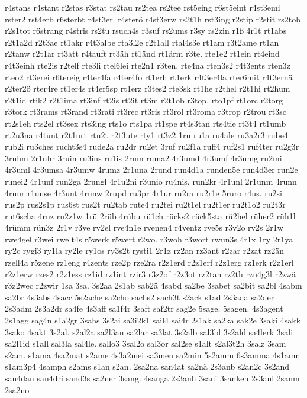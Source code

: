 {r4stans
r4stant
r2stas
r3stat
rs2tau
rs2tea
rs2tee
rst5eing
r6st5eint
r4st3emi
rster2
rst4erb
r6sterbt
r4st3erl
r4sterö
r4st3erw
rs2t1h
rst3ing
r2stip
r2stit
rs2tob
r2s1tot
r6strang
r4stris
rs2tu
rsuch4s
r3suf
rs2ums
r3sy
rs2zin
r1ß
4r1t
rt1abs
r2t1a2d
r2t3ae
rt1akr
r4t3albe
rta3l2e
r2t1all
rtal4s3e
rt1am
r3t2ame
rt1an
r2tanw
r2t1ar
rt3att
r4tauft
rt3äh
rt1änd
rt1ärm
r3te.
rte1e2
rt1ein
rt4eind
r4t3einh
rte2is
r2telf
rte3li
rtel6lei
rte2n1
r3ten.
rte4na
rten3s2
r4t3ents
rten3z
rteo2
rt3erei
r6tereig
r4ter4fa
r4ter4fo
rt1erh
rt1erk
r4t3er4la
rter6mit
r4t3ernä
r2ter2ö
rter4re
rt1er4s
rt4er5sp
rt1erz
r3tes2
rte3sk
rt1he
r2thel
r2t1hi
rt2hum
r2t1id
rtik2
r2t1ima
rt3inf
rt2is
rt2it
rt3m
r2t1ob
r3top.
rto1pf
rt1orc
r2torg
r3tork
rt3rams
rt3rand
rt3rati
rt3rec
rt3ris
rt3rol
rt3roma
r3trop
r2trou
rt3sc
rt2s1eh
rts2el
rt3sex
rts3ing
rts1o
rts1pa
rt1spe
rt4s3tan
rts4tie
rt3t4
rt1umb
rt2u3na
r4tunt
r2t1urt
rtu2t
r2t3ute
rty1
rt3z2
1ru
ru1a
ru4ale
ru3a2r3
rube4
rub2i
ru3ches
rucht3s4
rude2a
ru2dr
ru2et
3ruf
ru2f1a
ruff4
ruf2s1
ruf4ter
ru2g3r
3ruhm
2r1uhr
3ruin
ru3ins
ru1is
2rum
ruma2
4r3umd
4r3umf
4r3umg
ru2mi
4r3uml
4r3umsa
4r3umw
4rumz
2r1una
2rund
run4d1a
runden5e
run4d3er
run2e
runei2
4r1unf
run2ga
2rungl
4r1u2ni
r3unio
ru4nis.
run2kr
4r1unl
2r1unm
4runn
4runr
r1unse
4r3unt
4runw
2rupd
ru3pr
4r1ur
ru2ra
ru2r1e
5ruro
r4us.
ru2si
rus2p
rus2s1p
rus6st
rus2t
ru2tab
rute4
ru2tei
ru2t1el
ru2t1er
ru2t1o2
ru2t3r
rut6scha
4ruz
ru2z1w
1rü
2rüb
4rübu
rü1ch
rücks2
rück5sta
rü2hel
rüher2
rüh1l
4rümm
rün3z
2r1v
r3ve
rv2el
rve4n1e
rvenen4
r4ventz
rve5s
r3v2o
rv2s
2r1w
rwe4gel
r3wei
rwelt4s
r5werk
r5wert
r2wo.
r3woh
r3wort
rwun3s
4r1x
1ry
2r1ya
ry2c
rygi3
ry1la
ry2le
ry1os
ry3s2t
rysti1
2r1z
rz2an
rz3ant
r2zar
r2zat
rz2än
rzell4a
r5zene
rz1eng
r4zents
rze2p
rze2ra
r2z1erd
r2z1erf
r2z1erg
rz1erk
r2z1erl
r2z1erw
rzes2
r2z1ess
rz1id
rz1int
rzir3
r3z2of
r2z3ot
rz2tan
rz2th
rzu4g3l
r2zwä
r3z2wec
r2zwir
1sa
3sa.
3s2aa
2s1ab
sab2ä
4sabd
sa2be
3sabet
sa2bit
sa2bl
4sabm
sa2br
4s3abs
4sacc
5s2ache
sa2cho
sachs2
sach3t
s2ack
s1ad
2s3ada
sa2der
2s3adm
2s3a2dr
sa4fe
4s3aff
sa1f4r
3saft
saf2tr
sag2e
5sage.
5sagen.
4s3agent
2s1agg
sag4n
s1a2gr
3sahs
3s2ai
sa3i2k1
sail4
sai4r
2s1ak
sa2ka
sak2e
3saki
4sakk
3sako
4sakt
3s2al.
s2al2a
sa2l3an
sa2lar
sa3lat
3s2alb
sal3bl
3s2ald
sa4lerk
3sali
sa2l1id
s1all
sal3la
sal4le.
sallo3
3sal2o
sal3or
sal2se
s1alt
s2al3t2h
3salz
3sam
s2am.
s1ama
4sa2mat
s2ame
4s3a2mei
sa3men
sa2min
5s2amm
6s3amma
4s1amn
s1am3p4
4samph
s2ams
s1an
s2an.
2sa2na
san4at
sa2nä
2s3anb
s2an2c
3s2and
san4dan
san4dri
sand3s
sa2ner
3sang.
4sanga
2s3anh
3sani
3sanken
2s3anl
2sanm
2sa2no
}

